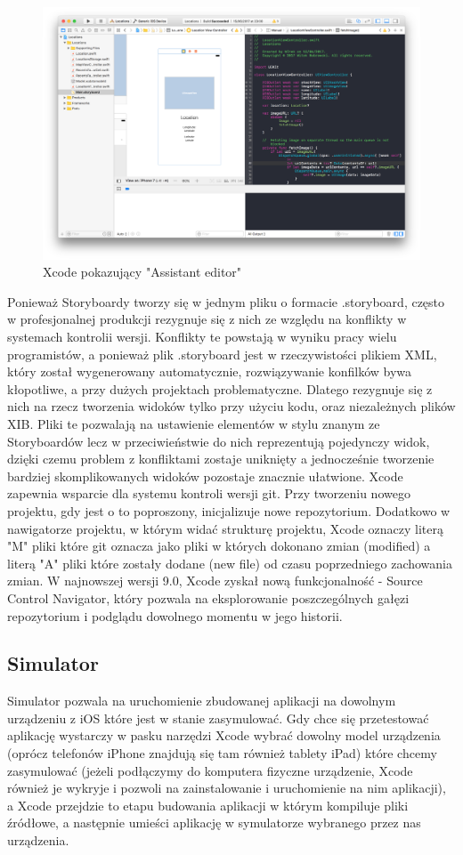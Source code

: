\begin{figure}[ht!]
  \centering
  \includegraphics[width=120mm]{images/chapter-2-image-2-xcode.png}
  \caption{Xcode pokazujący "Assistant editor"}
  \label{chapter-2-image-2-xcode}
\end{figure}

Ponieważ Storyboardy tworzy się w jednym pliku o formacie .storyboard, często w profesjonalnej produkcji rezygnuje się z nich ze względu na konflikty w systemach kontrolii wersji. Konflikty te powstają w wyniku pracy wielu programistów, a ponieważ plik .storyboard jest w rzeczywistości plikiem XML, który został wygenerowany automatycznie, rozwiązywanie konfilków bywa kłopotliwe, a przy dużych projektach problematyczne. Dlatego rezygnuje się z nich na rzecz tworzenia widoków tylko przy użyciu kodu, oraz niezależnych plików XIB. Pliki te pozwalają na ustawienie elementów w stylu znanym ze Storyboardów lecz w przeciwieństwie do nich reprezentują pojedynczy widok, dzięki czemu problem z konfliktami zostaje uniknięty a jednocześnie tworzenie bardziej skomplikowanych widoków pozostaje znacznie ułatwione. Xcode zapewnia wsparcie dla systemu kontroli wersji git. Przy tworzeniu nowego projektu, gdy jest o to poproszony, inicjalizuje nowe repozytorium. Dodatkowo w nawigatorze projektu, w którym widać strukturę projektu, Xcode oznaczy literą "M" pliki które git oznacza jako pliki w których dokonano zmian (modified) a literą "A" pliki które zostały dodane (new file) od czasu poprzedniego zachowania zmian.
W najnowszej wersji 9.0, Xcode zyskał nową funkcjonalność - Source Control Navigator, który pozwala na eksplorowanie poszczególnych gałęzi repozytorium i podglądu dowolnego momentu w jego historii.

\subsection{Simulator}
Simulator pozwala na uruchomienie zbudowanej aplikacji na dowolnym urządzeniu z iOS które jest w stanie zasymulować. Gdy chce się przetestować aplikację wystarczy w pasku narzędzi Xcode wybrać dowolny model urządzenia (oprócz telefonów iPhone znajdują się tam również tablety iPad) które chcemy zasymulować (jeżeli podłączymy do komputera fizyczne urządzenie, Xcode również je wykryje i pozwoli na zainstalowanie i uruchomienie na nim aplikacji), a Xcode przejdzie to etapu budowania aplikacji w którym kompiluje pliki źródłowe, a następnie umieści aplikację w symulatorze wybranego przez nas urządzenia.

